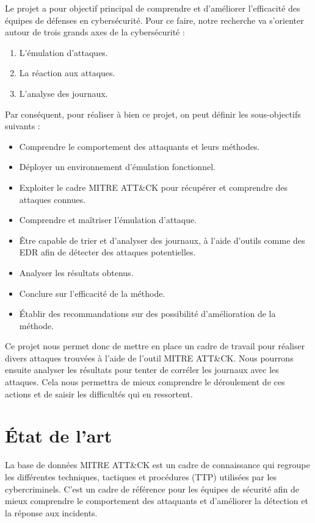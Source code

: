 \documentclass[12pt,letterpaper]{article}
\begin{document}
Le projet a pour objectif principal de comprendre et d'améliorer l'efficacité des équipes de défenses en cybersécurité.
Pour ce faire, notre recherche va s'orienter autour de trois grands axes de la cybersécurité :  
\begin{enumerate}
    \item L'émulation d'attaques.
    \item La réaction aux attaques.
    \item L'analyse des journaux.
\end{enumerate}
Par conséquent, pour réaliser à bien ce projet, on peut définir les sous-objectifs suivants :
\begin{itemize}
    \item Comprendre le comportement des attaquants et leurs méthodes.
    \item Déployer un environnement d'émulation fonctionnel.
    \item Exploiter le cadre MITRE ATT\&CK pour récupérer et comprendre des attaques connues.
    \item Comprendre et maîtriser l'émulation d'attaque.
    \item Être capable de trier et d'analyser des journaux, à l'aide d'outils comme des EDR afin de détecter des attaques potentielles.
    \item Analyser les résultats obtenus.
    \item Conclure sur l'efficacité de la méthode.
    \item Établir des recommandations sur des possibilité d'amélioration de la méthode.
\end{itemize}

Ce projet nous permet donc de mettre en place un cadre de travail pour réaliser divers attaques trouvées à l'aide de l'outil MITRE ATT\&CK.
Nous pourrons ensuite analyser les résultats pour tenter de corréler les journaux avec les attaques.
Cela nous permettra de mieux comprendre le déroulement de ces actions et de saisir les difficultés qui en ressortent.

\newpage
\section{État de l'art}
La base de données MITRE ATT\&CK est un cadre de connaissance qui regroupe les différentes techniques, tactiques et procédures (TTP) utilisées par les cybercriminels. 
C'est un cadre de référence pour les équipes de sécurité afin de mieux comprendre le comportement des attaquants et d'améliorer la détection et la réponse aux incidents.
\end{document}
